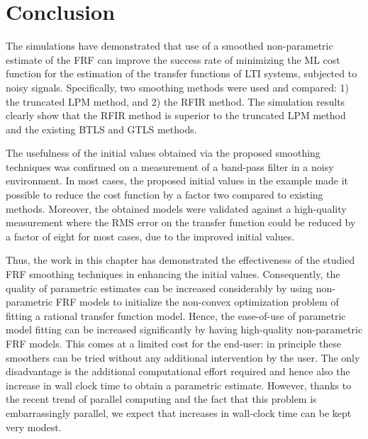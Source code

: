 \section{Conclusion}\label{se:Conclusion}
The simulations have demonstrated that use of a smoothed non-parametric estimate of the \gls{FRF} can improve the success rate of minimizing the \gls{ML} cost function for the estimation of the transfer functions of \gls{LTI} systems, subjected to noisy signals. Specifically, two smoothing methods were used and compared: 1) the truncated \gls{LPM} method, and 2) the \gls{RFIR} method. The simulation results clearly show that the \gls{RFIR} method is superior to the truncated \gls{LPM} method and the existing \gls{BTLS} and \gls{GTLS} methods.

The usefulness of the initial values obtained via the proposed smoothing techniques was confirmed on a measurement of a band-pass filter in a noisy environment.
In most cases, the proposed initial values in the example made it possible to reduce the cost function by a factor two compared to existing methods.
Moreover, the obtained models were validated against a high-quality measurement where the \gls{RMS} error on the transfer function could be reduced by a factor of eight for most cases, due to the improved initial values.

Thus, the work in this chapter has demonstrated the effectiveness of the studied \gls{FRF} smoothing techniques in enhancing the initial values.
Consequently, the quality of parametric estimates can be increased considerably by using non-parametric \gls{FRF} models to initialize the non-convex optimization problem of fitting a rational transfer function model.
Hence, the ease-of-use of parametric model fitting can be increased significantly by having high-quality non-parametric \gls{FRF} models.
This comes at a limited cost for the end-user: in principle these smoothers can be tried without any additional intervention by the user.
The only disadvantage is the additional computational effort required and hence also the increase in wall clock time to obtain a parametric estimate.
However, thanks to the recent trend of parallel computing and the fact that this problem is embarrassingly parallel, we expect that increases in wall-clock time can be kept very modest.


%

%
